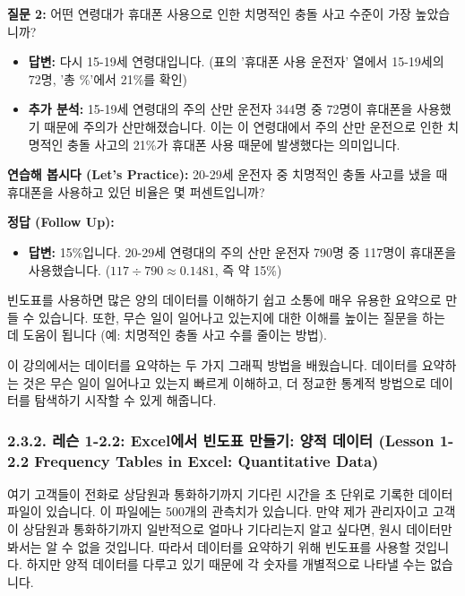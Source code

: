 \documentclass[11pt,a4paper]{article}
\theoremstyle{definition}
\begin{document}
\begin{examplebox}
\textbf{질문 2:} 어떤 연령대가 휴대폰 사용으로 인한 치명적인 충돌 사고 수준이 가장 높았습니까?
\begin{itemize}
    \item \textbf{답변:} 다시 15-19세 연령대입니다. (표의 '휴대폰 사용 운전자' 열에서 15-19세의 72명, '총 \%'에서 21\%를 확인)
    \item \textbf{추가 분석:} 15-19세 연령대의 주의 산만 운전자 344명 중 72명이 휴대폰을 사용했기 때문에 주의가 산만해졌습니다. 이는 이 연령대에서 주의 산만 운전으로 인한 치명적인 충돌 사고의 21\%가 휴대폰 사용 때문에 발생했다는 의미입니다.
\end{itemize}

\textbf{연습해 봅시다 (Let's Practice):}
20-29세 운전자 중 치명적인 충돌 사고를 냈을 때 휴대폰을 사용하고 있던 비율은 몇 퍼센트입니까?

\textbf{정답 (Follow Up):}
\begin{itemize}
    \item \textbf{답변:} 15\%입니다. 20-29세 연령대의 주의 산만 운전자 790명 중 117명이 휴대폰을 사용했습니다. ($117 \div 790 \approx 0.1481$, 즉 약 15\%)
\end{itemize}
빈도표를 사용하면 많은 양의 데이터를 이해하기 쉽고 소통에 매우 유용한 요약으로 만들 수 있습니다. 또한, 무슨 일이 일어나고 있는지에 대한 이해를 높이는 질문을 하는 데 도움이 됩니다 (예: 치명적인 충돌 사고 수를 줄이는 방법).

이 강의에서는 데이터를 요약하는 두 가지 그래픽 방법을 배웠습니다. 데이터를 요약하는 것은 무슨 일이 일어나고 있는지 빠르게 이해하고, 더 정교한 통계적 방법으로 데이터를 탐색하기 시작할 수 있게 해줍니다.
\end{examplebox}

\newpage
\subsubsection{2.3.2. 레슨 1-2.2: Excel에서 빈도표 만들기: 양적 데이터 (Lesson 1-2.2 Frequency Tables in Excel: Quantitative Data)}

\begin{tcolorbox}[title={Excel에서 고객 대기 시간 빈도표 만들기}]
여기 고객들이 전화로 상담원과 통화하기까지 기다린 시간을 초 단위로 기록한 데이터 파일이 있습니다. 이 파일에는 500개의 관측치가 있습니다. 만약 제가 관리자이고 고객이 상담원과 통화하기까지 일반적으로 얼마나 기다리는지 알고 싶다면, 원시 데이터만 봐서는 알 수 없을 것입니다. 따라서 데이터를 요약하기 위해 빈도표를 사용할 것입니다. 하지만 양적 데이터를 다루고 있기 때문에 각 숫자를 개별적으로 나타낼 수는 없습니다.

\begin{center}
\label{fig:excel_raw_data}
\end{center}
\end{tcolorbox}
\end{document}
